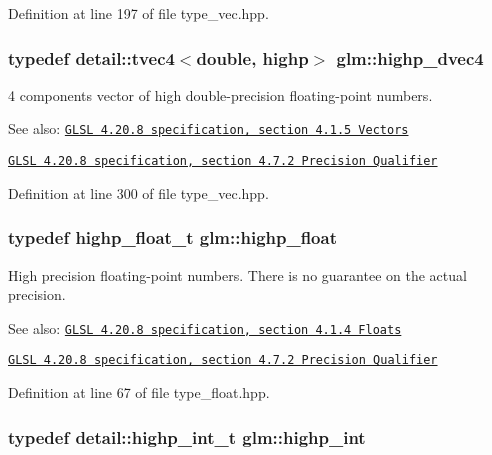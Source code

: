 Definition at line 197 of file type\_\-vec.hpp.\hypertarget{group__core__precision_gd5ff5ff4a69e6925f5b4f540e2633835}{
\subsubsection[highp\_\-dvec4]{\setlength{\rightskip}{0pt plus 5cm}typedef detail::tvec4$<$double, highp$>$ {\bf glm::highp\_\-dvec4}}}
\label{group__core__precision_gd5ff5ff4a69e6925f5b4f540e2633835}


4 components vector of high double-precision floating-point numbers.

\begin{Desc}
\item[See also:]\href{http://www.opengl.org/registry/doc/GLSLangSpec.4.20.8.pdf}{\tt GLSL 4.20.8 specification, section 4.1.5 Vectors} 

\href{http://www.opengl.org/registry/doc/GLSLangSpec.4.20.8.pdf}{\tt GLSL 4.20.8 specification, section 4.7.2 Precision Qualifier} \end{Desc}


Definition at line 300 of file type\_\-vec.hpp.\hypertarget{group__core__precision_g3d443a093adc053638ed7f81c5bfe300}{
\subsubsection[highp\_\-float]{\setlength{\rightskip}{0pt plus 5cm}typedef highp\_\-float\_\-t {\bf glm::highp\_\-float}}}
\label{group__core__precision_g3d443a093adc053638ed7f81c5bfe300}


High precision floating-point numbers. There is no guarantee on the actual precision.

\begin{Desc}
\item[See also:]\href{http://www.opengl.org/registry/doc/GLSLangSpec.4.20.8.pdf}{\tt GLSL 4.20.8 specification, section 4.1.4 Floats} 

\href{http://www.opengl.org/registry/doc/GLSLangSpec.4.20.8.pdf}{\tt GLSL 4.20.8 specification, section 4.7.2 Precision Qualifier} \end{Desc}


Definition at line 67 of file type\_\-float.hpp.\hypertarget{group__core__precision_gafed5240eb0a43328cb75faf5fb0a8c2}{
\subsubsection[highp\_\-int]{\setlength{\rightskip}{0pt plus 5cm}typedef detail::highp\_\-int\_\-t {\bf glm::highp\_\-int}}}
\label{group__core__precision_gafed5240eb0a43328cb75faf5fb0a8c2}


